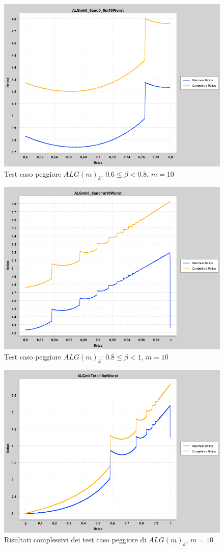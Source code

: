 \documentclass[12pt]{article}
\begin{document}
\begin{figure}[H]
\caption{Test caso peggiore $ALG(m)_{k}$: $0.6 \leq \beta < 0.8$, $m = 10$}
\centering
\includegraphics[scale=0.4]{max/ALGmk0_6and0_8m10Worst.png}
\end{figure}
\begin{figure}[H]
\caption{Test caso peggiore $ALG(m)_{k}$: $0.8 \leq \beta < 1$, $m = 10$}
\centering
\includegraphics[scale=0.4]{max/ALGmk0_8and1m10Worst.png}
\end{figure}
\begin{figure}[H]
\caption{Risultati complessivi dei test caso peggiore di $ALG(m)_{k}$, $m = 10$}
\centering
\includegraphics[scale=0.4]{max/ALGmkTotalm10Worst.png}
\end{figure}
\end{document}
